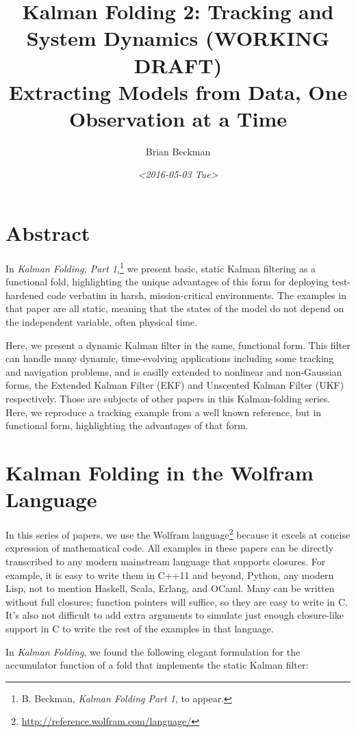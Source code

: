 \documentclass[10pt,oneside,x11names]{article}
\author{Brian Beckman}
\date{\textit{<2016-05-03 Tue>}}
\title{Kalman Folding 2: Tracking and System Dynamics (WORKING DRAFT)\\\medskip
\large Extracting Models from Data, One Observation at a Time}
\begin{document}
\maketitle
\setcounter{tocdepth}{2}
\tableofcontents


\section{Abstract}
\label{sec:orgheadline1}

In \emph{Kalman Folding, Part 1},\footnote{B. Beckman, \emph{Kalman Folding Part 1}, to appear.} we present basic, static Kalman filtering
as a functional fold, highlighting the unique advantages of this form for
deploying test-hardened code verbatim in harsh, mission-critical environments.
The examples in that paper are all static, meaning that the states of the model
do not depend on the independent variable, often physical time.

Here, we present a dynamic Kalman filter in the same, functional form. This
filter can handle many dynamic, time-evolving applications including some
tracking and navigation problems, and is easilly extended to nonlinear and
non-Gaussian forms, the Extended Kalman Filter (EKF) and Unscented Kalman Filter
(UKF) respectively. Those are subjects of other papers in this Kalman-folding
series. Here, we reproduce a tracking example from a well known reference, but
in functional form, highlighting the advantages of that form.

\section{Kalman Folding in the Wolfram Language}
\label{sec:orgheadline2}

In this series of papers, we use the Wolfram language\footnote{\url{http://reference.wolfram.com/language/}} because it excels
at concise expression of mathematical code. All examples in these papers can be
directly transcribed to any modern mainstream language that supports closures.
For example, it is easy to write them in C++11 and beyond, Python, any modern
Lisp, not to mention Haskell, Scala, Erlang, and OCaml. Many can be written
without full closures; function pointers will suffice, so they are easy to write
in C. It's also not difficult to add extra arguments to simulate just enough
closure-like support in C to write the rest of the examples in that language.

In \emph{Kalman Folding},\footnotemark[1]{} we found the following elegant formulation for the
accumulator function of a fold that implements the static Kalman filter:
\end{document}
